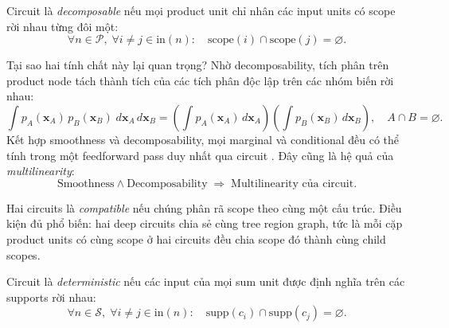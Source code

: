 \begin{definition}
\label{def:decomposability}
Circuit là \emph{decomposable} nếu mọi product unit chỉ nhân các input units có
scope rời nhau từng đôi một:
\begin{equation}
    \forall n \in \mathcal{P},\;
    \forall i \neq j \in \mathrm{in}(n):\quad
    \mathrm{scope}(i) \cap \mathrm{scope}(j) = \varnothing.
\end{equation}
\end{definition}

Tại sao hai tính chất này lại quan trọng?  Nhờ decomposability, tích phân trên
product node tách thành tích của các tích phân độc lập trên các nhóm biến rời nhau:
\begin{equation}
    \int p_A(\mathbf{x}_A)\, p_B(\mathbf{x}_B)\;
    d\mathbf{x}_A\, d\mathbf{x}_B
    = \left(\int p_A(\mathbf{x}_A)\, d\mathbf{x}_A\right)
      \left(\int p_B(\mathbf{x}_B)\, d\mathbf{x}_B\right),
    \quad A \cap B = \varnothing.
    \label{eq:factored-integral}
\end{equation}
Kết hợp smoothness và decomposability, mọi marginal và conditional đều có thể tính
trong một feedforward pass duy nhất qua circuit
\cite{chrysos2025foundationsTutorial, vergari2021compositional}. Đây cũng là hệ
quả của \emph{multilinearity}:
\begin{equation}
    \text{Smoothness} \wedge \text{Decomposability}
    \;\Rightarrow\;
    \text{Multilinearity của circuit}.
\end{equation}

\begin{definition}
\label{def:compatibility}
Hai circuits là \emph{compatible} nếu chúng phân rã scope theo cùng một cấu trúc.
Điều kiện đủ phổ biến: hai deep circuits chia sẻ cùng tree region graph, tức là mỗi
cặp product units có cùng scope ở hai circuits đều chia scope đó thành cùng child
scopes.
\end{definition}

\begin{definition}
\label{def:determinism}
Circuit là \emph{deterministic} nếu các input của mọi sum unit được định nghĩa trên
các supports rời nhau:
\begin{equation}
    \forall n \in \mathcal{S},\;
    \forall i \neq j \in \mathrm{in}(n):\quad
    \mathrm{supp}(c_i) \cap \mathrm{supp}(c_j) = \varnothing.
\end{equation}
\end{definition}

